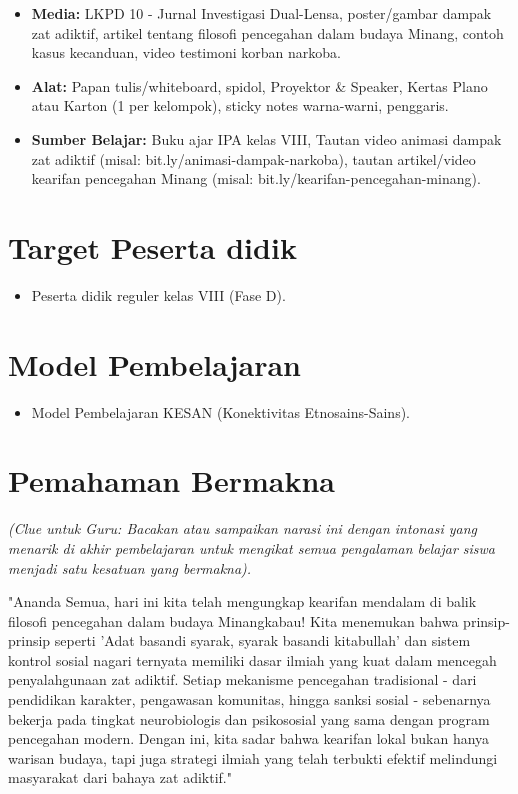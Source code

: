 \documentclass[a4paper,12pt]{article}
\begin{document}
\begin{itemize}
\item \textbf{Media:} LKPD 10 - Jurnal Investigasi Dual-Lensa, poster/gambar dampak zat adiktif, artikel tentang filosofi pencegahan dalam budaya Minang, contoh kasus kecanduan, video testimoni korban narkoba.
\item \textbf{Alat:} Papan tulis/whiteboard, spidol, Proyektor \& Speaker, Kertas Plano atau Karton (1 per kelompok), sticky notes warna-warni, penggaris.
\item \textbf{Sumber Belajar:} Buku ajar IPA kelas VIII, Tautan video animasi dampak zat adiktif (misal: bit.ly/animasi-dampak-narkoba), tautan artikel/video kearifan pencegahan Minang (misal: bit.ly/kearifan-pencegahan-minang).
\end{itemize}

\section{Target Peserta didik}

\begin{itemize}
\item Peserta didik reguler kelas VIII (Fase D).
\end{itemize}

\section{Model Pembelajaran}

\begin{itemize}
\item Model Pembelajaran KESAN (Konektivitas Etnosains-Sains).
\end{itemize}

\section{Pemahaman Bermakna}
\textit{(Clue untuk Guru: Bacakan atau sampaikan narasi ini dengan intonasi yang menarik di akhir pembelajaran untuk mengikat semua pengalaman belajar siswa menjadi satu kesatuan yang bermakna).}

\begin{tcolorbox}[sectionbox]
"Ananda Semua, hari ini kita telah mengungkap kearifan mendalam di balik filosofi pencegahan dalam budaya Minangkabau! Kita menemukan bahwa prinsip-prinsip seperti 'Adat basandi syarak, syarak basandi kitabullah' dan sistem kontrol sosial nagari ternyata memiliki dasar ilmiah yang kuat dalam mencegah penyalahgunaan zat adiktif. Setiap mekanisme pencegahan tradisional - dari pendidikan karakter, pengawasan komunitas, hingga sanksi sosial - sebenarnya bekerja pada tingkat neurobiologis dan psikososial yang sama dengan program pencegahan modern. Dengan ini, kita sadar bahwa kearifan lokal bukan hanya warisan budaya, tapi juga strategi ilmiah yang telah terbukti efektif melindungi masyarakat dari bahaya zat adiktif."
\end{tcolorbox}
\end{document}
